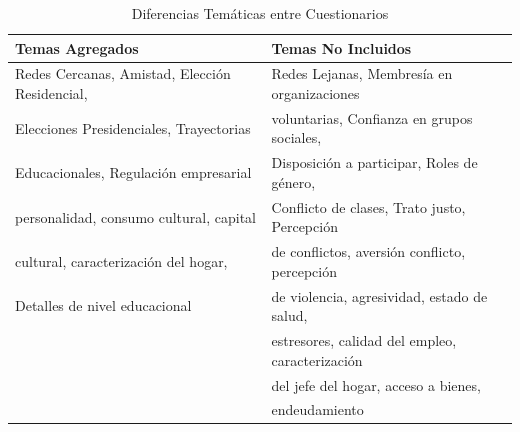 \documentclass[12pt]{report}
\begin{document}
\begin{table}[H]
	\footnotesize
	\centering
	\caption{Diferencias Temáticas entre Cuestionarios}
	\label{table:difcuest}
	\begin{tabular}{l l}
		\toprule
		\textbf{Temas Agregados}&\textbf{Temas No Incluidos}\\
		\midrule
Redes Cercanas, Amistad, Elección Residencial,  & Redes Lejanas, Membresía en organizaciones\\
Elecciones Presidenciales, Trayectorias               &  voluntarias, Confianza en grupos sociales,\\
Educacionales, Regulación empresarial                & Disposición a participar, Roles de género,\\
personalidad, consumo cultural, capital & Conflicto de clases, Trato justo, Percepción  \\
cultural, caracterización del hogar, & de conflictos, aversión conflicto, percepción  \\
Detalles de nivel educacional & de violencia, agresividad, estado de salud, \\
& estresores, calidad del empleo, caracterización \\
& del jefe del hogar, acceso a bienes, \\
& endeudamiento\\ 
		\bottomrule
	\end{tabular}
\end{table}


\newcolumntype{b}{X}
\end{document}

